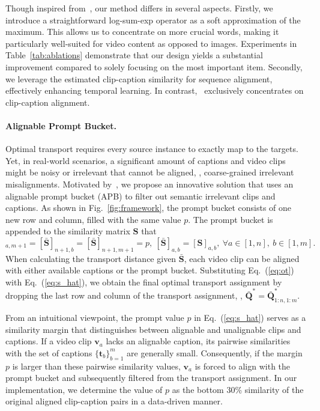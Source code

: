 Though inspired from~\cite{wang2022disentangled,yao2021filip}, our method differs in several aspects. Firstly, we introduce a straightforward  log-sum-exp operator as a soft approximation of the maximum. This allows us to concentrate on more crucial words, making it particularly well-suited for video content as opposed to images. Experiments in Table~\ref{tab:ablations} demonstrate that our design yields a substantial improvement compared to solely focusing on the most important item. Secondly, we leverage the estimated clip-caption similarity for sequence alignment, effectively enhancing temporal learning. In contrast,~\cite{wang2022disentangled} exclusively concentrates on clip-caption alignment.

  
 

\paragraph{Alignable Prompt Bucket.} Optimal transport requires every source instance to exactly map to the targets. Yet, in real-world scenarios, a significant amount of captions and video clips might be noisy or irrelevant that cannot be aligned, \ie, coarse-grained irrelevant misalignments. Motivated by~\cite{sarlin2020superglue}, we propose an innovative solution that uses an alignable prompt bucket (APB) to filter out semantic irrelevant clips and captions.
As shown in Fig.~\ref{fig:framework}, the prompt bucket consists of one new row and column, filled with the same value $p$. The prompt bucket is appended to the similarity matrix $\mathbf{S}$ that
\begin{equation}
  [\bar{\mathbf{S}}]_{a, m+1}=[\bar{\mathbf{S}}]_{n+1, b}=[\bar{\mathbf{S}}]_{n+1, m+1}=p,
     ~
     [\bar{\mathbf{S}}]_{a, b} =[{\mathbf{S}}]_{a, b}, 
      ~
     \forall
  a \in [1,n],~  b \in [1,m].
  \label{eq:s_hat}
\end{equation}
When calculating the transport distance given $\bar{\mathbf{S}}$, each video clip can be aligned with either available captions or the prompt bucket. 
Substituting Eq.~(\ref{eq:ot}) with Eq.~(\ref{eq:s_hat}), we obtain the final optimal transport assignment by dropping the last row and column of the transport assignment, \ie, ${\bar{\mathbf{Q}}}^*= \bar{\mathbf{Q}}^*_{1: n,1:m}$.

From an intuitional viewpoint, the prompt value $p$ in Eq.~(\ref{eq:s_hat}) serves as a similarity margin that distinguishes between alignable and unalignable clips and captions. If a video clip $\mathbf{v}_a$ lacks an alignable caption, its pairwise similarities with the set of captions $\{\mathbf{t}_b\}_{b=1}^m$ are generally small. Consequently, if the margin $p$ is larger than these pairwise similarity values, $\mathbf{v}_a$ is forced to align with the prompt bucket and subsequently filtered from the transport assignment. In our implementation, we determine the value of $p$ as the bottom 30\% similarity of the original aligned clip-caption pairs in a data-driven manner.

